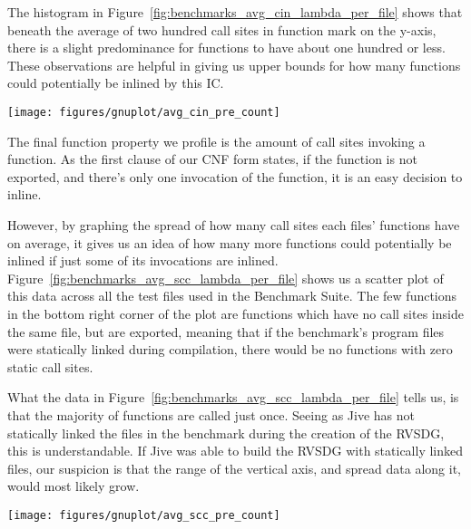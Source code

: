 The histogram in Figure~\ref{fig:benchmarks_avg_cin_lambda_per_file} shows that
beneath the average of two hundred call sites in function mark on the y-axis,
there is a slight predominance for functions to have about one hundred or less.
These observations are helpful in giving us upper bounds for how many functions
could potentially be inlined by this IC.

\begin{centering}
	\noindent\begin{minipage}{\textwidth}
		\captionsetup{type=figure}
		\hspace{-1em}
		\texttt{[image: figures/gnuplot/avg\_cin\_pre\_count]}
	\end{minipage}
	\label{fig:benchmarks_avg_cin_lambda_per_file}
\end{centering}

The final function property we profile is the amount of call sites invoking a
function. As the first clause of our CNF form states, if the function is not
exported, and there's only one invocation of the function, it is an easy
decision to inline.

However, by graphing the spread of how many call sites each files' functions
have on average, it gives us an idea of how many more functions could
potentially be inlined if just some of its invocations are inlined.
Figure~\ref{fig:benchmarks_avg_scc_lambda_per_file} shows us a scatter plot of
this data across all the test files used in the Benchmark Suite. The few
functions in the bottom right corner of the plot are functions which have no
call sites inside the same file, but are exported, meaning that if the
benchmark's program files were statically linked during compilation, there would
be no functions with zero static call sites.

What the data in Figure~\ref{fig:benchmarks_avg_scc_lambda_per_file} tells us,
is that the majority of functions are called just once. Seeing as Jive has not
statically linked the files in the benchmark during the creation of the RVSDG,
this is understandable. If Jive was able to build the RVSDG with statically
linked files, our suspicion is that the range of the vertical axis, and spread data along it, would most likely grow.

\begin{centering}
	\noindent\begin{minipage}{\textwidth}
		\captionsetup{type=figure}
		\hspace{-1em}
		\texttt{[image: figures/gnuplot/avg\_scc\_pre\_count]}
	\end{minipage}
	\label{fig:benchmarks_avg_scc_lambda_per_file}
\end{centering}

